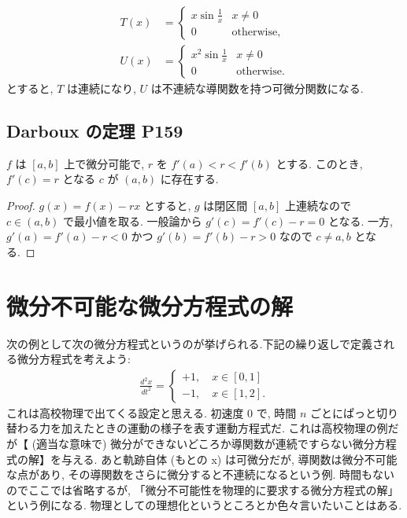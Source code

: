\documentclass[openany, a4paper, oneside]{jsbook}
\begin{document}
\begin{align}
 T (x)
 &=
 \begin{cases}
  x \sin \frac{1}{x} & x \neq 0 \\
  0 & \mathrm{otherwise},
 \end{cases} \\
 U (x)
 &=
 \begin{cases}
  x^2 \sin \frac{1}{x} & x \neq 0 \\
  0 & \mathrm{otherwise}.
 \end{cases}
\end{align}
とすると, $T$ は連続になり, $U$ は不連続な導関数を持つ可微分関数になる.
\subsection{Darboux の定理 \cite{WilliamDumham1} P159}

$f$ は $[a, b]$ 上で微分可能で, $r$ を $f'(a) < r < f'(b)$ とする.
このとき, $f'(c) = r$ となる $c$ が $(a, b)$ に存在する.

\begin{proof}
 $g (x) = f (x) - rx$ とすると, $g$ は閉区間 $[a, b]$ 上連続なので $c \in (a, b)$ で最小値を取る.
 一般論から $g'(c) = f'(c) - r = 0$ となる.
 一方, $g'(a) = f'(a) - r < 0$ かつ $g'(b) = f'(b) - r > 0$ なので $c \neq a, b$ となる.
\end{proof}
\section{微分不可能な微分方程式の解}

次の例として次の微分方程式というのが挙げられる.下記の繰り返しで定義される微分方程式を考えよう:
\begin{align}
 \frac{d^2 x}{dt^2}
 =
 \begin{cases}
 +1, \quad x \in [0,1] \\
 -1, \quad x \in [1,2].
 \end{cases}
\end{align}
これは高校物理で出てくる設定と思える.
初速度 0 で, 時間 $n$ ごとにぱっと切り替わる力を加えたときの運動の様子を表す運動方程式だ.
これは高校物理の例だが【 (適当な意味で) 微分ができないどころか導関数が連続ですらない微分方程式の解】を与える.
あと軌跡自体 (もとの x) は可微分だが, 導関数は微分不可能な点があり, その導関数をさらに微分すると不連続になるという例.
時間もないのでここでは省略するが, 「微分不可能性を物理的に要求する微分方程式の解」という例になる.
物理としての理想化というところとか色々言いたいことはある.
\end{document}
